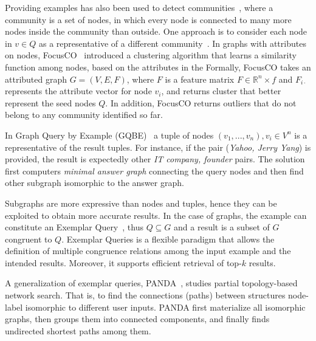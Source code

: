 Providing examples has also been used to detect communities~\citep{staudt2014detecting,perozzi2014focused}, where a community is a set of nodes, in which every node is connected to many more nodes inside the community than outside. 
One approach is to consider each node in $v \in Q$ as a representative of a different community~\citep{staudt2014detecting}. 
In graphs with attributes on nodes, FocusCO~\citep{perozzi2014focused} introduced a clustering algorithm that learns a similarity function among nodes, based on the attributes in the 
Formally, FocusCO takes an attributed graph $G = (V,E,F)$, where $F$ is a feature matrix $F \in \mathbb{R}^n\times f$ and $F_{i\cdot}$ represents the attribute vector for node $v_i$, and returns cluster that better represent the seed nodes $Q$.
In addition, FocusCO returns outliers that do not belong to any community identified so far.  



In Graph Query by Example (GQBE)~\citep{jayaram2015querying} a tuple of nodes $(v_1, ..., v_n), v_i \in V^n$ is a representative of the result tuples. 
For instance, if the pair (\emph{Yahoo, Jerry Yang}) is provided, the result is expectedly other \emph{IT company, founder} pairs. 
The solution first computers \emph{minimal answer graph} connecting the query nodes and then find other subgraph isomorphic to the answer graph. 

Subgraphs are more expressive than nodes and tuples, hence they can be exploited to obtain more accurate results. 
In the case of graphs, the example can constitute an Exemplar Query~\citep{mottin2016exemplar}, thus $Q\subseteq G$ and a result is a subset of $G$ congruent to $Q$.
Exemplar Queries is a flexible paradigm that allows the definition of multiple congruence relations among the input example and the intended results. 
Moreover, it supports efficient retrieval of top-$k$ results. 

A generalization of exemplar queries, PANDA~\citep{xie2017panda}, studies partial topology-based network search. 
That is, to find the connections (paths) between structures node-label isomorphic to different user inputs. 
PANDA first materialize all isomorphic graphs, then groups them into connected components, and finally finds undirected shortest paths among them. 


